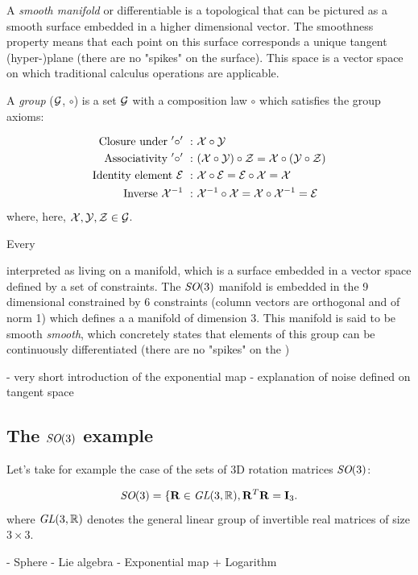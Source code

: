 A \textit{smooth manifold} or differentiable is a topological that can be pictured as a smooth surface embedded in a higher dimensional vector.
The smoothness property means that each point on this surface corresponds a unique tangent (hyper-)plane (there are no "spikes" on the surface).
This space is a vector space on which traditional calculus operations are applicable.

A \textit{group} ($\mathcal{G}$, $\circ$) is a set $\mathcal{G}$ with a composition law $\circ$ which satisfies the group axioms:

\begin{align}
    \text{Closure under}~'\circ'~:&~\mathcal{X} \circ \mathcal{Y} \\ 
    \text{Associativity}~'\circ'~:&~(\mathcal{X} \circ \mathcal{Y}) \circ \mathcal{Z} = \mathcal{X} \circ (\mathcal{Y} \circ \mathcal{Z}) \\ 
    \text{Identity element}~\mathcal{E}~:&~\mathcal{X} \circ \mathcal{E} = \mathcal{E} \circ \mathcal{X} = \mathcal{X} \\ 
    \text{Inverse}~\mathcal{X}^{-1}~:&~\mathcal{X}^{-1} \circ \mathcal{X} = \mathcal{X} \circ \mathcal{X}^{-1} = \mathcal{E}
\end{align}
where, here, $\mathcal{X},\mathcal{Y},\mathcal{Z} \in \mathcal{G}$.

Every




interpreted as living on a manifold, which is a surface embedded in a vector space defined by a set of constraints. 
The $\textit{SO}(3)$ manifold is embedded in the 9 dimensional constrained by 6 constraints (column vectors are orthogonal and of norm 1) which defines a 
a manifold of dimension 3. This manifold is said to be smooth \textit{smooth}, which concretely states that elements of this group can be 
continuously differentiated (there are no "spikes" on the )

  
- very short introduction of the exponential map
- explanation of noise defined on tangent space

\subsection{The $\textit{SO}(3)$ example}
Let's take for example the case of the sets of 3D rotation matrices $\textit{SO}(3)$:

\begin{equation*}
    \textit{SO}(3) = \{ {\bf R} \in \textit{GL}(3,\mathbb{R}), {\bf R}^T {\bf R}  = {\bf I}_3.
\end{equation*}
where $\textit{GL}(3,\mathbb{R})$ denotes the general linear group of invertible real matrices of size $3 \times 3$.

- Sphere
- Lie algebra
- Exponential map + Logarithm

